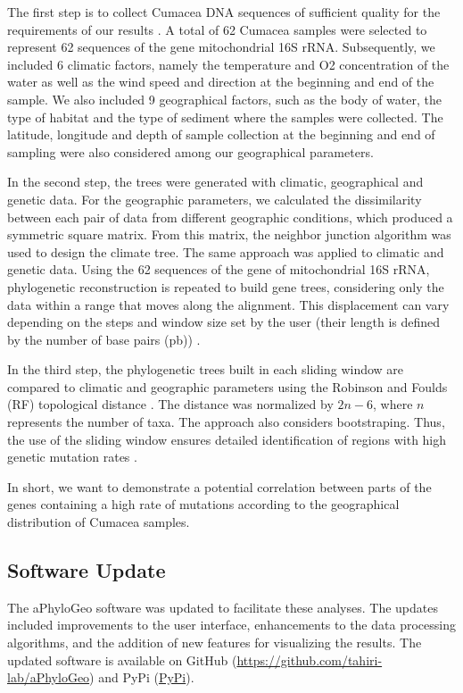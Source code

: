     The first step is to collect Cumacea DNA sequences of sufficient quality for the requirements of our results \citep{koshkarov_phylogeography_2022}. A total of 62 Cumacea samples were selected to represent 62 sequences of the gene mitochondrial 16S rRNA. Subsequently, we included 6 climatic factors, namely the temperature and O2 concentration of the water as well as the wind speed and direction at the beginning and end of the sample. We also included 9 geographical factors, such as the body of water, the type of habitat and the type of sediment where the samples were collected. The latitude, longitude and depth of sample collection at the beginning and end of sampling were also considered among our geographical parameters.

    In the second step, the trees were generated with climatic, geographical and genetic data. For the geographic parameters, we calculated the dissimilarity between each pair of data from different geographic conditions, which produced a symmetric square matrix. From this matrix, the neighbor junction algorithm was used to design the climate tree. The same approach was applied to climatic and genetic data. Using the 62 sequences of the gene of mitochondrial 16S rRNA, phylogenetic reconstruction is repeated to build gene trees, considering only the data within a range that moves along the alignment. This displacement can vary depending on the steps and window size set by the user (their length is defined by the number of base pairs (pb)) \citep{koshkarov_phylogeography_2022}.

    In the third step, the phylogenetic trees built in each sliding window are compared to climatic and geographic parameters using the Robinson and Foulds (RF) topological distance \citep{robinson_comparison_1981, koshkarov_phylogeography_2022}. The distance was normalized by $2n-6$, where $n$ represents the number of taxa. The approach also considers bootstraping. Thus, the use of the sliding window ensures detailed identification of regions with high genetic mutation rates \citep{koshkarov_phylogeography_2022}.

In short, we want to demonstrate a potential correlation between parts of the genes containing a high rate of mutations according to the geographical distribution of Cumacea samples.

\subsection{Software Update}
The aPhyloGeo software was updated to facilitate these analyses. The updates included improvements to the user interface, enhancements to the data processing algorithms, and the addition of new features for visualizing the results. The updated software is available on GitHub (\url{https://github.com/tahiri-lab/aPhyloGeo}) and PyPi (\href{https://pypi.org/project/aphylogeo/}{PyPi}).

